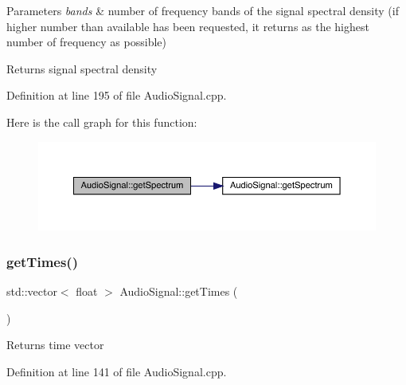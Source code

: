 \begin{DoxyParams}{Parameters}
{\em bands} & number of frequency bands of the signal spectral density (if higher number than available has been requested, it returns as the highest number of frequency as possible) \\
\hline
\end{DoxyParams}
\begin{DoxyReturn}{Returns}
signal spectral density 
\end{DoxyReturn}


Definition at line 195 of file Audio\+Signal.\+cpp.

Here is the call graph for this function\+:
\nopagebreak
\begin{figure}[H]
\begin{center}
\leavevmode
\includegraphics[width=350pt]{class_audio_signal_ae49bd4dc391e6ae0e8a673ff8d5089fb_cgraph}
\end{center}
\end{figure}
\mbox{\label{class_audio_signal_afff46a70335800ba93ae513bdea7e4c9}} 
\subsubsection{\texorpdfstring{get\+Times()}{getTimes()}\hspace{0.1cm}{\footnotesize\ttfamily [1/2]}}
{\footnotesize\ttfamily std\+::vector$<$ float $>$ Audio\+Signal\+::get\+Times (\begin{DoxyParamCaption}{ }\end{DoxyParamCaption})}

\begin{DoxyReturn}{Returns}
time vector 
\end{DoxyReturn}


Definition at line 141 of file Audio\+Signal.\+cpp.

\mbox{\label{class_audio_signal_aa04d6fcd3219f4bb8d77916c60d85ad2}} 
